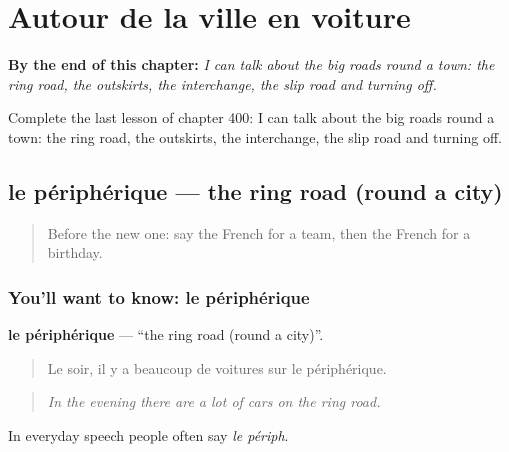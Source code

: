 
\chapter{Autour de la ville en voiture}
\label{ch:fr-autour-de-la-ville-en-voiture}

\begin{chapteropening}
\textbf{By the end of this chapter:} \emph{I can talk about the big roads round a town: the ring road, the outskirts, the interchange, the slip road and turning off.}

Complete the last lesson of chapter 400: I can talk about the big roads round a town: the ring road, the outskirts, the interchange, the slip road and turning off.
\end{chapteropening}

\section[le périphérique]{le périphérique — the ring road (round a city)}

\label{lesson:FR-C400-peripherique}



\begin{quote}
Before the new one: say the French for a team, then the French for a birthday.
\end{quote}

\subsection*{You'll want to know: le périphérique}
\textbf{le périphérique} — \textquotedblleft{}the ring road (round a city)\textquotedblright{}.

\begin{quote}
Le soir, il y a beaucoup de voitures sur le périphérique.
\end{quote}

\begin{quote}
\emph{In the evening there are a lot of cars on the ring road.}
\end{quote}

In everyday speech people often say \emph{le périph}.

